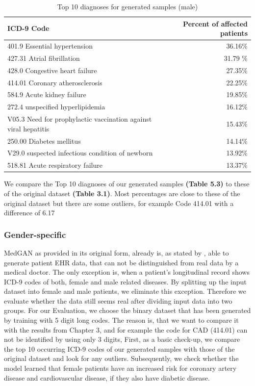 \documentclass[11pt, a4paper]{book}
\begin{document}
\begin{table}
\begin{tabular}{l|r}
\textbf{ICD-9 Code} & \textbf{Percent of affected patients}\\
\hline
401.9  Essential hypertension & 36.16\%\\
427.31 Atrial fibrillation & 31.79 \%\\
428.0 Congestive heart failure & 27.35\%\\
414.01 Coronary atherosclerosis & 22.25\%\\
584.9 Acute kidney failure & 19.85\%\\
272.4 unspecified hyperlipidemia & 16.12\%\\
V05.3 Need for prophylactic vaccination against viral hepatitis & 15.43\%\\
250.00 Diabetes mellitus & 14.14\%\\
V29.0 suspected infectious condition of newborn & 13.92\%\\
518.81  Acute respiratory failure & 13.37\%\\
\end{tabular}
\caption{\label{tab:top10-icd-mixed}Top 10 diagnoses for generated samples (male)}
\end{table}

We compare the Top 10 diagnoses of our generated samples \textbf{(Table 5.3)} to these of the original dataset \textbf{(Table 3.1)}. Most percentages are close to these of the original dataset but there are some outliers, for example Code 414.01 with a difference of 6.17%

\subsubsection{Gender-specific}
MedGAN as provided in its original form, already is, as stated by \cite{Choi2017}, able to generate patient EHR data, that can not be distinguished from real data by a medical doctor. The only exception is, when a patient's longitudinal record shows ICD-9 codes of both, female and male related diseases.  \cite{Choi2017}
By splitting up the input dataset into female and male patients, we eliminate this exception. Therefore we evaluate whether the data still seems real after dividing input data into two groups. For our Evaluation, we choose the binary dataset that has been generated by training with 5 digit long codes. The reason is, that we want to compare it with the results from Chapter 3, and for example the code for CAD (414.01) can not be identified by using only 3 digits,
First, as a basic check-up, we compare the top 10 occurring ICD-9 codes of our generated samples with those of the original dataset and look for any outliers. Subsequently, we check whether the model learned that female patients have an increased risk for coronary artery disease and cardiovascular disease, if they also have diabetic disease. 
\end{document}

